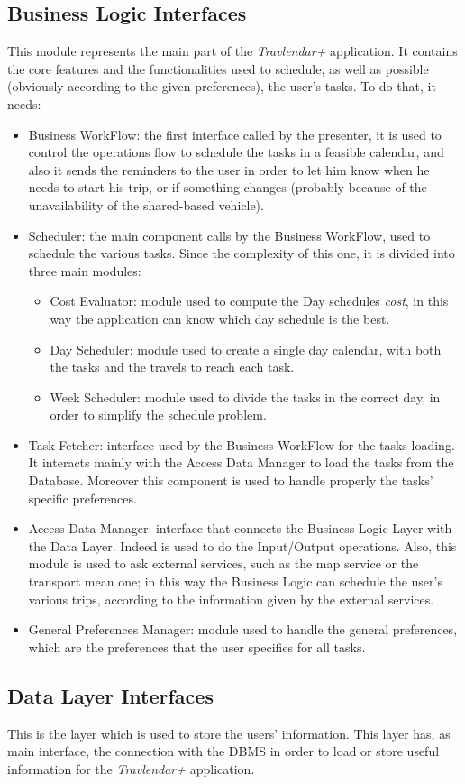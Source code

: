 \subsection*{Business Logic Interfaces}
This module represents the main part of the \emph{Travlendar+} application. It contains the core features and the functionalities used to schedule, as well as possible (obviously according to the given preferences), the user's tasks. To do that, it needs:
\begin{itemize}
    \item Business WorkFlow: the first interface called by the presenter, it is used to control the operations flow to schedule the tasks in a feasible calendar, and also it sends the reminders to the user in order to let him know when he needs to start his trip, or if something changes (probably because of the unavailability of the shared-based vehicle).
    \item Scheduler: the main component calls by the Business WorkFlow, used to schedule the various tasks. Since the complexity of this one, it is divided into three main modules:
    
    \begin{itemize}
        \item Cost Evaluator: module used to compute the Day schedules \emph{cost}, in this way the application can know which day schedule is the best.
        \item Day Scheduler: module used to create a single day calendar, with both the tasks and the travels to reach each task.
        \item Week Scheduler: module used to divide the tasks in the correct day, in order to simplify the schedule problem.
    \end{itemize}
    
    \item Task Fetcher: interface used by the Business WorkFlow for the tasks loading. It interacts mainly with the Access Data Manager to load the tasks from the Database. Moreover this component is used to handle properly the tasks' specific preferences.
    
    \item Access Data Manager: interface that connects the Business Logic Layer with the Data Layer. Indeed is used to do the Input/Output operations. Also, this module is used to ask external services, such as the map service or the transport mean one; in this way the Business Logic can schedule the user's various trips, according to the information given by the external services.
    
    \item General Preferences Manager: module used to handle the general preferences, which are the preferences that the user specifies for all tasks.
    
\end{itemize}

\subsection*{Data Layer Interfaces}
This is the layer which is used to store the users' information. This layer has, as main interface, the connection with the DBMS in order to load or store useful information for the \emph{Travlendar+} application.